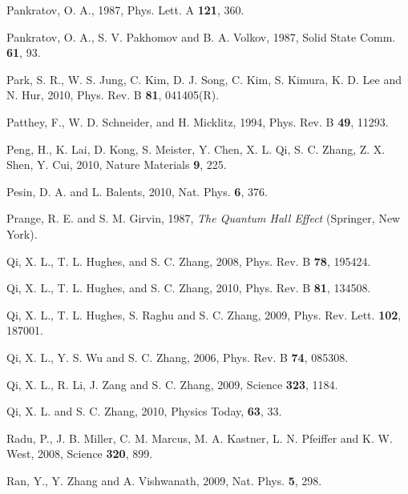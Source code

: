 \documentclass[twocolumn,floatfix,showpacs,rmp,aps]{revtex4}
\begin{document}
\begin{thebibliography}{99}
		Pankratov, O. A., 1987,
		Phys. Lett. A {\bf 121}, 360.
		
		Pankratov, O. A., S. V. Pakhomov and B. A. Volkov, 1987,
		Solid State Comm. {\bf 61}, 93.
		
		Park, S. R., W. S. Jung, C. Kim, D. J. Song, C. Kim, S. Kimura, K. D. Lee and N. Hur, 2010,
		Phys. Rev. B {\bf 81}, 041405(R).
		
		Patthey, F., W. D. Schneider, and H. Micklitz, 1994,
		Phys. Rev. B {\bf 49}, 11293.
		
		Peng, H., K. Lai, D. Kong, S. Meister, Y. Chen, X. L. Qi, S. C. Zhang, Z. X. Shen, Y. Cui, 2010,
		Nature Materials {\bf 9}, 225.
		
		Pesin, D. A. and L. Balents, 2010,
		Nat. Phys. {\bf 6}, 376.
		
		Prange, R. E. and S. M. Girvin, 1987,
		{\it The Quantum Hall Effect} (Springer, New York).
		
		Qi, X. L., T. L. Hughes, and S. C. Zhang, 2008,
		Phys. Rev. B {\bf 78}, 195424.
		
		Qi, X. L., T. L. Hughes, and S. C. Zhang, 2010,
		Phys. Rev. B {\bf 81}, 134508.
		
		Qi, X. L., T. L. Hughes, S. Raghu and S. C. Zhang, 2009,
		Phys. Rev. Lett. {\bf 102}, 187001.
		
		Qi, X. L., Y. S. Wu and S. C. Zhang, 2006,
		Phys. Rev. B {\bf 74}, 085308.
		
		Qi, X. L., R. Li, J. Zang and S. C. Zhang, 2009,
		Science {\bf 323}, 1184.
		
		Qi, X. L. and S. C. Zhang, 2010,
		Physics Today, {\bf 63}, 33.
		
		Radu, P., J. B. Miller, C. M. Marcus, M. A. Kastner, L. N. Pfeiffer and K. W. West, 2008,
		Science {\bf 320}, 899.
		
		Ran, Y., Y. Zhang and A. Vishwanath, 2009,
		Nat. Phys. {\bf 5}, 298.
		

\end{thebibliography}
\end{document}
